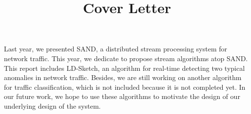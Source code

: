 \documentclass[a4paper, 12pt]{article}
\begin{document}
\title{\huge Cover Letter}
\date{}


\maketitle



Last year, we presented SAND, a distributed stream processing system for network traffic.
This year, we dedicate to propose stream algorithms atop SAND.
This report includes LD-Sketch, an algorithm for real-time detecting two typical anomalies in network traffic.
Besides, we are still working on another algorithm for traffic classification, which is not included because it is not completed yet.
In our future work, we hope to use these algorithms to motivate the design of our underlying design of the system.


%
%
\end{document}

